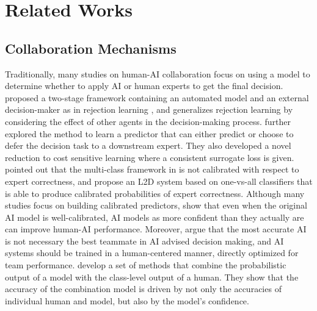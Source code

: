 \section{Related Works}
\subsection{Collaboration Mechanisms}

Traditionally, many studies on human-AI collaboration focus on using a model to determine whether to apply AI or human experts to get the final decision. \citet{Predict2018Madras} proposed a two-stage framework containing an automated model and an external decision-maker as in rejection learning \citep{Cortes2016Learning, Zhang2023A}, and generalizes rejection learning by considering the effect of other agents in the decision-making process. \citet{Hussein2020Consistent} further explored the method to learn a predictor that can either predict or choose to defer the decision task to a downstream expert. They also developed a novel reduction to cost sensitive learning where a consistent surrogate loss is given. \citet{verma2022calibrated} pointed out that the multi-class framework in \citep{Hussein2020Consistent} is not calibrated with respect to expert correctness, and propose an L2D system based on one-vs-all classifiers that is able to produce calibrated probabilities of expert correctness. Although many studies focus on building calibrated predictors, \citet{vodrahalli2022uncalibrated} show that even when the original AI model is well-calibrated, AI models as more confident than they actually are can improve human-AI performance.
Moreover, \citet{Is2021Bansal} argue that the most accurate AI is not necessary the best teammate in AI advised decision making, and AI systems should be trained in a human-centered manner, directly optimized for team performance. \citet{kerrigan2021combining} develop a set of methods that combine the probabilistic output of a model with the class-level output of a human. They show that the accuracy of the combination model is driven by not only the accuracies of individual human and model, but also by the model's confidence. 


